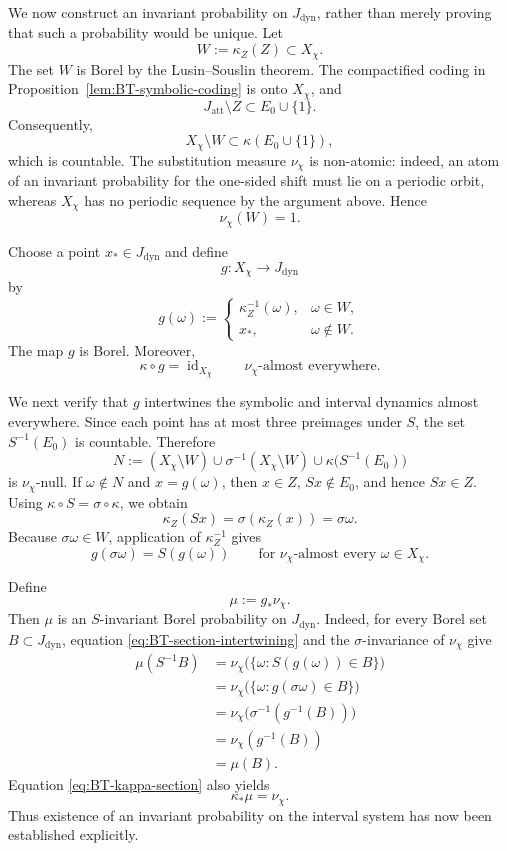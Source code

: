 \documentclass[11pt]{amsart}
\theoremstyle{plain}
\theoremstyle{definition}
\theoremstyle{remark}
\begin{document}
We now construct an invariant probability on \(J_{\mathrm{dyn}}\), rather
than merely proving that such a probability would be unique. Let
\[
        W:=\kappa_Z(Z)\subset X_\chi.
\]
The set \(W\) is Borel by the Lusin--Souslin theorem. The compactified
coding in Proposition~\ref{lem:BT-symbolic-coding} is onto \(X_\chi\), and
\[
        J_{\mathrm{att}}\setminus Z\subset E_0\cup\{1\}.
\]
Consequently,
\[
        X_\chi\setminus W
        \subset
        \kappa(E_0\cup\{1\}),
\]
which is countable. The substitution measure \(\nu_\chi\) is non-atomic:
indeed, an atom of an invariant probability for the one-sided shift must
lie on a periodic orbit, whereas \(X_\chi\) has no periodic sequence by
the argument above. Hence
\[
        \nu_\chi(W)=1.
\]

Choose a point \(x_*\in J_{\mathrm{dyn}}\) and define
\[
        g:X_\chi\longrightarrow J_{\mathrm{dyn}}
\]
by
\[
        g(\omega)
        :=
        \begin{cases}
        \kappa_Z^{-1}(\omega),&\omega\in W,\\
        x_*,&\omega\notin W.
        \end{cases}
\]
The map \(g\) is Borel. Moreover,
\[
        \kappa\circ g
        =
        \operatorname{id}_{X_\chi}
        \qquad
        \nu_\chi\text{-almost everywhere}.
\tag{8.5}
\label{eq:BT-kappa-section}
\]

We next verify that \(g\) intertwines the symbolic and interval dynamics
almost everywhere. Since each point has at most three preimages under
\(S\), the set \(S^{-1}(E_0)\) is countable. Therefore
\[
        N
        :=
        (X_\chi\setminus W)
        \cup
        \sigma^{-1}(X_\chi\setminus W)
        \cup
        \kappa\bigl(S^{-1}(E_0)\bigr)
\]
is \(\nu_\chi\)-null. If \(\omega\notin N\) and
\(x=g(\omega)\), then \(x\in Z\), \(Sx\notin E_0\), and hence
\(Sx\in Z\). Using \(\kappa\circ S=\sigma\circ\kappa\), we obtain
\[
        \kappa_Z(Sx)
        =
        \sigma(\kappa_Z(x))
        =
        \sigma\omega.
\]
Because \(\sigma\omega\in W\), application of \(\kappa_Z^{-1}\) gives
\[
        g(\sigma\omega)=S(g(\omega))
        \qquad
        \text{for }\nu_\chi\text{-almost every }\omega\in X_\chi.
\tag{8.6}
\label{eq:BT-section-intertwining}
\]

Define
\[
        \mu:=g_*\nu_\chi.
\]
Then \(\mu\) is an \(S\)-invariant Borel probability on
\(J_{\mathrm{dyn}}\). Indeed, for every Borel set
\(B\subset J_{\mathrm{dyn}}\), equation
\eqref{eq:BT-section-intertwining} and the \(\sigma\)-invariance of
\(\nu_\chi\) give
\[
\begin{aligned}
\mu(S^{-1}B)
&=
\nu_\chi\bigl(\{\omega:S(g(\omega))\in B\}\bigr)\\
&=
\nu_\chi\bigl(\{\omega:g(\sigma\omega)\in B\}\bigr)\\
&=
\nu_\chi\bigl(\sigma^{-1}(g^{-1}(B))\bigr)\\
&=
\nu_\chi(g^{-1}(B))\\
&=
\mu(B).
\end{aligned}
\]
Equation \eqref{eq:BT-kappa-section} also yields
\[
        \kappa_*\mu=\nu_\chi.
\tag{8.7}
\label{eq:BT-mu-symbolic-pushforward}
\]
Thus existence of an invariant probability on the interval system has
now been established explicitly.
\end{document}
